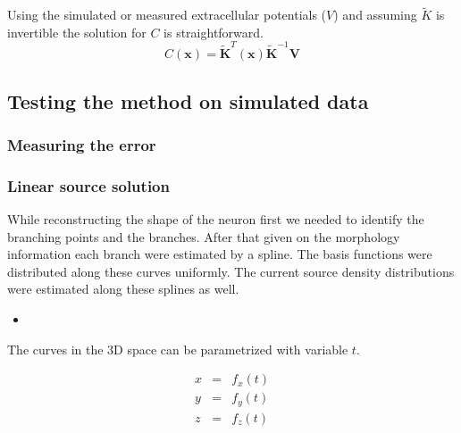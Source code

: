 \documentclass[12pt,a4paper]{article}
\begin{document}
Using the simulated or measured extracellular potentials ($V$) and assuming $\tilde{K}$ is invertible the solution for $C$ is straightforward.
 \begin{equation}
 C(\textbf{x})=\tilde{\textbf{K}}^T(\textbf{x})  
 \tilde{\textbf{K}}^{-1} \textbf{V}
 \end{equation}


\subsection{Testing the method on simulated data}



\subsubsection{Measuring the error}



\subsubsection{ Linear source solution }
While reconstructing the shape of the neuron first we needed to identify the branching points and the branches. After that given on the morphology information each branch were estimated by a spline. The basis functions were distributed along these curves uniformly. The current source density distributions were estimated along these splines as well. 



\begin{itemize}
\item 
\end{itemize}
The curves in the 3D space can be parametrized with variable $t$. 


\begin{eqnarray}
\displaystyle x &=& f_x(t)  \nonumber \\
\displaystyle y &=& f_y(t)  \\
\displaystyle z &=& f_z(t)  \nonumber 
\end{eqnarray}
\end{document}
